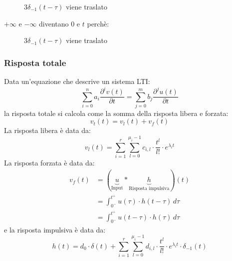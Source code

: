 \documentclass[a4paper]{article}
\begin{document}
\begin{exercise}
\begin{figure}[H]
    \caption{\( 3 \delta_{-1}(t - \tau) \) viene traslato}
  \end{figure}
  \( +\infty \) e \( -\infty \) diventano \( 0 \) e \( t \) perchè:
  \begin{figure}[H]
    \centering
    \caption{\( 3 \delta_{-1}(t - \tau) \) viene traslato}
  \end{figure}
\end{exercise}

\subsubsection{Risposta totale}
Data un'equazione che descrive un sistema LTI:
\[
  \sum_{i=0}^{n} a_i \frac{\partial^{i} v(t)}{\partial t} = \sum_{j=0}^{m} b_j \frac{\partial^{j} u(t)}{\partial t}
\] 
la risposta totale si calcola come la somma della risposta libera e forzata:
\[
  v_t(t) = v_l(t) + v_f(t)
\] 
La risposta libera è data da:
\[
  v_l(t) = \sum_{i=1}^{r} \sum_{l=0}^{\mu_i - 1} c_{i,l} \cdot \frac{t^l}{l!} \cdot e^{\lambda_i t}
\] 
La risposta forzata è data da:
\[
  \begin{aligned}
    v_f(t) &= (\underbrace{u}_{\text{Input}} \ast \underbrace{h}_{\text{Risposta impulsiva}})(t)\\
           &= \int_{0^-}^{t^+} u(\tau) \cdot h(t-\tau) \, d\tau\\
           &= \int_{0^-}^{t^+} u(t-\tau) \cdot h(\tau) \, d\tau
  \end{aligned}
\]
e la risposta impulsiva è data da:
\[
  h(t) = d_0 \cdot \delta(t) + \sum_{i=1}^{r} \sum_{l=0}^{\mu_i - 1} d_{i,l} \cdot \frac{t^l}{l!} \cdot e^{\lambda_i t} \cdot \delta_{-1}(t)
\]
\end{document}
